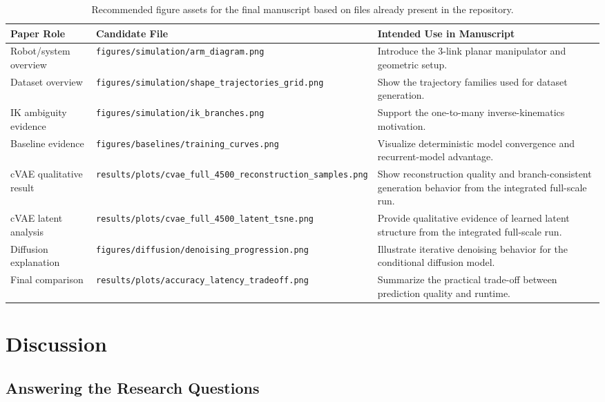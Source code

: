 \documentclass[11pt]{article}
\begin{document}
\begin{table}[h]
\centering
\caption{Recommended figure assets for the final manuscript based on files already present in the repository.}
\label{tab:figure_plan}
\begin{tabular}{p{2.5cm}p{5.1cm}p{6.2cm}}
\toprule
Paper Role & Candidate File & Intended Use in Manuscript \\
\midrule
Robot/system overview & \texttt{figures/simulation/arm\_diagram.png} & Introduce the 3-link planar manipulator and geometric setup. \\
Dataset overview & \texttt{figures/simulation/shape\_trajectories\_grid.png} & Show the trajectory families used for dataset generation. \\
IK ambiguity evidence & \texttt{figures/simulation/ik\_branches.png} & Support the one-to-many inverse-kinematics motivation. \\
Baseline evidence & \texttt{figures/baselines/training\_curves.png} & Visualize deterministic model convergence and recurrent-model advantage. \\
cVAE qualitative result & \texttt{results/plots/cvae\_full\_4500\_reconstruction\_samples.png} & Show reconstruction quality and branch-consistent generation behavior from the integrated full-scale run. \\
cVAE latent analysis & \texttt{results/plots/cvae\_full\_4500\_latent\_tsne.png} & Provide qualitative evidence of learned latent structure from the integrated full-scale run. \\
Diffusion explanation & \texttt{figures/diffusion/denoising\_progression.png} & Illustrate iterative denoising behavior for the conditional diffusion model. \\
Final comparison & \texttt{results/plots/accuracy\_latency\_tradeoff.png} & Summarize the practical trade-off between prediction quality and runtime. \\
\bottomrule
\end{tabular}
\end{table}

\section{Discussion}

\subsection{Answering the Research Questions}
\end{document}
